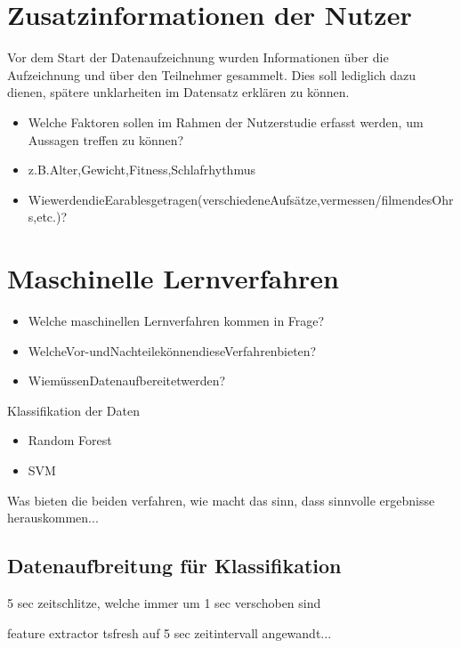 \section{Zusatzinformationen der Nutzer}
\label{ch:sa:additionalUserStudiesInformation}
Vor dem Start der Datenaufzeichnung wurden Informationen über die Aufzeichnung und über den Teilnehmer gesammelt. Dies soll lediglich dazu dienen, spätere unklarheiten im Datensatz erklären zu können.
\begin{itemize}
    \item Welche Faktoren sollen im Rahmen der Nutzerstudie erfasst werden, um Aussagen treffen zu können? 
    \item z.B.Alter,Gewicht,Fitness,Schlafrhythmus
    \item WiewerdendieEarablesgetragen(verschiedeneAufsätze,vermessen/filmendesOhrs,etc.)?
\end{itemize}


\section{Maschinelle Lernverfahren}
\label{ch:sa:machine_learning}
\begin{itemize}
    \item Welche maschinellen Lernverfahren kommen in Frage?
    \item WelcheVor-undNachteilekönnendieseVerfahrenbieten? 
    \item WiemüssenDatenaufbereitetwerden?
\end{itemize}

Klassifikation der Daten
\begin{itemize}
    \item Random Forest
    \item SVM
\end{itemize}

Was bieten die beiden verfahren, wie macht das sinn, dass sinnvolle ergebnisse herauskommen...

\subsection{Datenaufbreitung für Klassifikation}
\label{ch:sa:machine_learning:data_handling}

5 sec zeitschlitze, welche immer um 1 sec verschoben sind

feature extractor tsfresh auf 5 sec zeitintervall angewandt...
